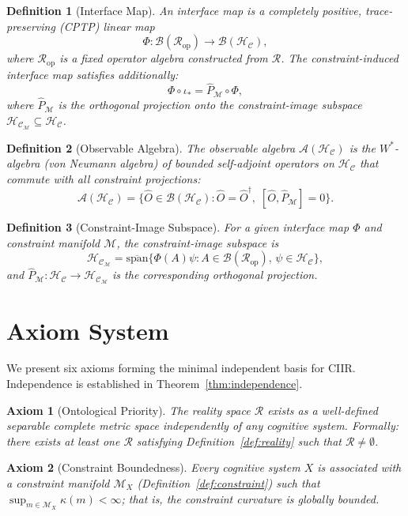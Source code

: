 \documentclass[twocolumn,aps,prd,superscriptaddress,nofootinbib]{revtex4-2}
\newtheorem{definition}{Definition}[section]
\newtheorem{axiom}{Axiom}[section]
\newcommand{\HC}{\mathcal{H}_{\mathcal{C}}}
\newcommand{\CR}{\mathcal{R}}
\newcommand{\CM}{\mathcal{M}}
\newcommand{\CA}{\mathcal{A}}
\newcommand{\CB}{\mathcal{B}}
\newcommand{\hatO}{\hat{O}}
\newcommand{\hatP}{\hat{P}}
\begin{document}
\begin{definition}[Interface Map]
\label{def:interface}
An \emph{interface map} is a completely positive, trace-preserving (CPTP)
linear map
\[
  \Phi : \CB(\CR_\mathrm{op}) \to \CB(\HC),
\]
where $\CR_\mathrm{op}$ is a fixed operator algebra constructed from $\CR$.
The constraint-induced interface map satisfies additionally:
\[
  \Phi \circ \iota_* = \hatP_\CM \circ \Phi,
\]
where $\hatP_\CM$ is the orthogonal projection onto the
constraint-image subspace $\HC_\CM \subseteq \HC$.
\end{definition}

\begin{definition}[Observable Algebra]
\label{def:observable}
The \emph{observable algebra} $\CA(\HC)$ is the $W^*$-algebra (von Neumann
algebra) of bounded self-adjoint operators on $\HC$ that commute with all
constraint projections: 
\[
  \CA(\HC) = \bigl\{ \hatO \in \CB(\HC) : \hatO = \hatO^\dagger,\;
    [\hatO, \hatP_\CM] = 0 \bigr\}.
\]
\end{definition}

\begin{definition}[Constraint-Image Subspace]
\label{def:subspace}
For a given interface map $\Phi$ and constraint manifold $\CM$, the
\emph{constraint-image subspace} is
\[
  \HC_\CM = \overline{\mathrm{span}}\bigl\{
    \Phi(A)\psi : A \in \CB(\CR_\mathrm{op}),\, \psi \in \HC \bigr\},
\]
and $\hatP_\CM : \HC \to \HC_\CM$ is the corresponding orthogonal projection.
\end{definition}

\section{Axiom System}
\label{sec:axioms}

We present six axioms forming the minimal independent basis for CIIR.
Independence is established in Theorem~\ref{thm:independence}.

\begin{axiom}[Ontological Priority]
\label{ax:ontological}
The reality space $\CR$ exists as a well-defined separable complete metric
space independently of any cognitive system.  Formally: there exists at least
one $\CR$ satisfying Definition~\ref{def:reality} such that $\CR \neq
\emptyset$.
\end{axiom}

\begin{axiom}[Constraint Boundedness]
\label{ax:bounded}
Every cognitive system $X$ is associated with a constraint manifold $\CM_X$
(Definition~\ref{def:constraint}) such that
$\sup_{m \in \CM_X} \kappa(m) < \infty$; that is, the constraint curvature is
globally bounded.
\end{axiom}
\end{document}
